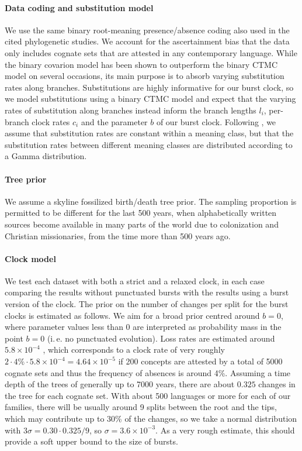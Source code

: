 \documentclass[a4paper,12pt]{scrartcl}
\begin{document}
\paragraph{Data coding and substitution model}
We use the same binary root-meaning presence/absence coding also used in the
cited phylogenetic studies. We account for the ascertainment bias that the data
only includes cognate sets that are attested in any contemporary language.
While the binary covarion model has been shown to outperform the binary CTMC
model on several occasions, its main purpose is to absorb varying substitution
rates along branches. Substitutions are highly informative for our burst clock,
so we model substitutions using a binary CTMC model and expect that the varying
rates of substitution along branches instead inform the branch lengths $l_i$,
per-branch clock rates $c_i$ and the parameter $b$ of our burst clock.
Following \parencite{BEASTLINGPAPER?}, we assume that substitution rates are constant within a
meaning class, but that the substitution rates between different meaning classes
are distributed according to a Gamma distribution.

\paragraph{Tree prior} We assume a skyline fossilized birth/death tree prior.
The sampling proportion is permitted to be different for the last 500 years,
when alphabetically written sources become available in many parts of the world
due to colonization and Christian missionaries, from the time more than 500 years ago.

\paragraph{Clock model}
We test each dataset with both a strict and a relaxed clock, in each case
comparing the results without punctuated bursts with the results
using a burst version of the clock. The prior on the number of changes per split for the 
burst clocks is estimated as follows. We aim for a broad prior centred around $b=0$,
where parameter values less than 0 are interpreted as probability mass in the point $b=0$ (i.\,e. no punctuated evolution).
Loss rates are estimated around $5.8 × 10^{-4}$ \parencite[405]{pagel2000history}, which
corresponds to a clock rate of very roughly $2 \cdot 4\% \cdot 5.8 × 10^{-4}=4.64\times 10^{-5}$
if 200 concepts are attested by a total of 5000 cognate sets and thus the frequency of absences is around 4\%.
Assuming a time depth of the trees of generally up to 7000 years,
there are about $0.325$ changes in the tree for each cognate set. With about 500 languages or more for each of our 
families, there will be usually around 9 splits between the root and the
tips, which may contribute up to 30\% \parencite{greenhill} of the changes, so we take a
normal distribution with $3\sigma = 0.30 \cdot 0.325 / 9$, so $\sigma=3.6 \times 10^{-3}$.
As a very rough estimate, this should provide a soft upper bound to the size of bursts.
\end{document}
